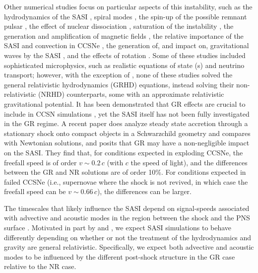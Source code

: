 Other numerical studies focus on particular aspects of this instability,
such as the hydrodynamics of the SASI
\citep{oky2006,sff2009,iny2014},
spiral modes
\citep{bs2007,iko2008,f2010},
the spin-up of the possible remnant pulsar
\citep{bm2007},
the effect of nuclear dissociation
\citep{ft2009},
saturation of the instability
\citep{gsf2010},
the generation and amplification of magnetic fields
\citep{ecb2010,ecb2012},
the relative importance of the SASI and convection in CCSNe
\citep{cb2015},
the generation of, and impact on, gravitational waves by the SASI
\citep{%
koy2007,
kio2009,
kkt2016,
a2017,
kkt2017,
amm2017,
oc2018b,
hkk2018,
amj2019,
mml2020,
mml2023,
dad2023},
and the effects of rotation
\citep{yy2005,yf2008,wft2023,bfg2023}.
Some of these studies included sophisticated microphysics, such as
realistic equations of state (\eos s)\repl{,}{} and neutrino transport;
however, with the exception of \citet{kkt2017},
none of these studies solved the general relativistic hydrodynamics (GRHD)
equations, instead solving their non-relativistic (NRHD) counterparts,
some with an approximate relativistic gravitational potential.
It has been demonstrated that GR effects are crucial to include in CCSN
simulations \citep{bdm2001,mjm2012,lmm2012,oc2018a}, yet the SASI itself
has not been fully investigated in the GR regime.
A recent paper \citep{kc2022} does analyze steady state accretion
through a stationary shock onto compact objects in a
Schwarzchild geometry and compares with Newtonian solutions, and posits
that GR may have a non-negligible impact on the SASI.
They find that, for conditions expected in exploding CCSNe,
the freefall speed is of order $v\sim0.2\,c$
(with $c$ the speed of light), and
the differences between the GR and NR solutions are of order 10\%.
For conditions expected in failed CCSNe (i.e., supernovae where the
shock is not revived, in which case the freefall speed can be
$v\sim0.66\,c$), the differences can be larger.

The timescales that likely influence the SASI depend on signal-speeds
associated with advective and acoustic modes in the region
between the shock and the PNS surface
\citep{bm2006,fgs2007,m2020}.
Motivated in part by \citet{dem2020} and \citet{kc2022},
we expect SASI simulations to behave differently depending
on whether or not the treatment of the hydrodynamics and gravity
are general relativistic.
Specifically, we expect both advective and acoustic modes to be
influenced by the different post-shock structure in the GR case
relative to the NR case.

